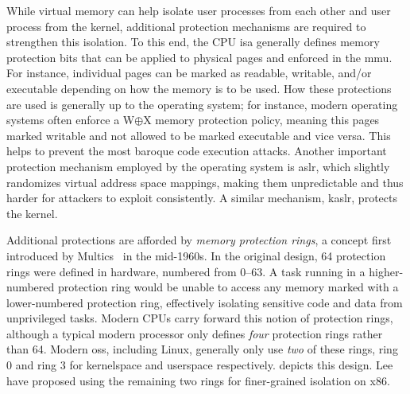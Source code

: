 While virtual memory can help isolate user processes from each other and user process from
the kernel, additional protection mechanisms are required to strengthen this isolation. To
this end, the CPU \gls{isa} generally defines memory protection bits that can be applied
to physical pages and enforced in the \gls{mmu}. For instance, individual pages can be
marked as readable, writable, and/or executable depending on how the memory is to be used.
How these protections are used is generally up to the operating system; for instance,
modern operating systems often enforce a W$\oplus$X memory protection policy, meaning this
pages marked writable and not allowed to be marked executable and vice versa. This helps
to prevent the most baroque code execution attacks. Another important protection mechanism
employed by the operating system is \gls{aslr}, which slightly randomizes virtual address
space mappings, making them unpredictable and thus harder for attackers to exploit
consistently. A similar mechanism, \gls{kaslr}, protects the kernel.

Additional protections are afforded by \textit{memory protection rings}, a concept first
introduced by Multics~\cite{vyssotsky1965_multics, corbato1965_multics} in the mid-1960s.
In the original design, 64 protection rings were defined in hardware, numbered from 0--63.
A task running in a higher-numbered protection ring would be unable to access any memory
marked with a lower-numbered protection ring, effectively isolating sensitive code and
data from unprivileged tasks. Modern CPUs carry forward this notion of protection rings,
although a typical modern processor only defines \textit{four} protection rings rather
than 64. Modern \gls{os}s, including Linux, generally only use \textit{two} of these
rings, ring 0 and ring 3 for kernelspace and userspace respectively. 
depicts this design. Lee \etal~\cite{lee2018_lotr} have proposed using the remaining two
rings for finer-grained isolation on x86.

